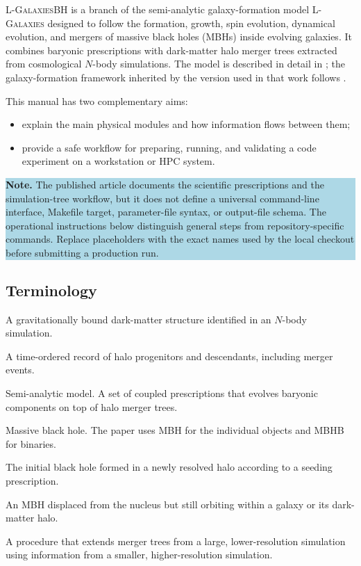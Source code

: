\documentclass[11pt,a4paper]{article}
\newcommand{\Lgal}{\textsc{L-Galaxies}}
\newcommand{\Lgalbh}{\textsc{L-GalaxiesBH}}
\newcommand{\note}[1]{\par\noindent\colorbox{lightblue}{\parbox{0.96\linewidth}{\textbf{Note.} #1}}\par}
\begin{document}
\Lgalbh{} is a branch of the semi-analytic galaxy-formation model \Lgal{} designed to follow the formation, growth, spin evolution, dynamical evolution, and mergers of massive black holes (MBHs) inside evolving galaxies. It combines baryonic prescriptions with dark-matter halo merger trees extracted from cosmological $N$-body simulations. The model is described in detail in \citet{Bonoli2025}; the galaxy-formation framework inherited by the version used in that work follows \citet{Henriques2015}.

This manual has two complementary aims:
\begin{itemize}
  \item explain the main physical modules and how information flows between them;
  \item provide a safe workflow for preparing, running, and validating a code experiment on a workstation or HPC system.
\end{itemize}

\note{The published article documents the scientific prescriptions and the simulation-tree workflow, but it does not define a universal command-line interface, Makefile target, parameter-file syntax, or output-file schema. The operational instructions below distinguish general steps from repository-specific commands. Replace placeholders with the exact names used by the local checkout before submitting a production run.}

\subsection{Terminology}
\begin{description}[style=nextline,leftmargin=4.0cm]
  \item[DM halo] A gravitationally bound dark-matter structure identified in an $N$-body simulation.
  \item[Merger tree] A time-ordered record of halo progenitors and descendants, including merger events.
  \item[SAM] Semi-analytic model. A set of coupled prescriptions that evolves baryonic components on top of halo merger trees.
  \item[MBH] Massive black hole. The paper uses MBH for the individual objects and MBHB for binaries.
  \item[Seed] The initial black hole formed in a newly resolved halo according to a seeding prescription.
  \item[Wandering MBH] An MBH displaced from the nucleus but still orbiting within a galaxy or its dark-matter halo.
  \item[Grafting] A procedure that extends merger trees from a large, lower-resolution simulation using information from a smaller, higher-resolution simulation.
\end{description}
\end{document}
